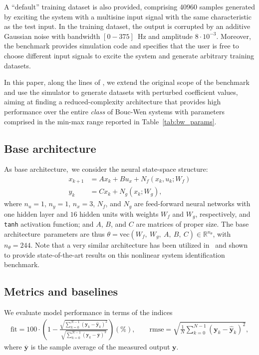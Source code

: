 \documentclass{article}
\newcommand{\base}{{base architecture}}
\newcommand{\seq}[1]{{\mathbf{#1}}}
\newcommand{\R}{\mathbb{R}}
\newcommand{\nsamp}{N}
\newcommand{\fullpar}{\theta}
\begin{document}
A ``default'' training dataset is also provided,  comprising 40960 samples generated by exciting the system with a multisine input signal with the same characteristic as the test input. In the training dataset, the output is corrupted by an additive Gaussian noise with bandwidth $[0 -375]$~Hz and amplitude $8 \cdot 10^{-3}$. Moreover, the benchmark provides simulation code and specifies that the user is free to choose different input signals to excite the system and generate arbitrary training datasets. 

In this paper, along the lines of \cite{chakrabarty2025meta}, we extend the original scope of the benchmark~\cite{noel2016hysteretic} and use the simulator to generate datasets with perturbed coefficient values, aiming at finding a reduced-complexity architecture that provides high performance over the entire \emph{class} of Bouc-Wen systems with parameters comprised in the min-max range reported in Table~\ref{tab:bw_params}. 


\subsection{Base architecture}
As \base,\ we consider the neural state-space structure:
\begin{subequations}
\label{eq:ss_boucwen}
\begin{align}
    x_{k+1} &= A x_k + B u_x + N_f(x_k, u_k; W_f) \\
    y_{k} &= C x_k +  N_g(x_k; W_g),
\end{align}
\end{subequations}
where $n_u=1$, $n_y=1$, $n_x=3$, $N_f$, and $N_g$ are feed-forward neural networks with one hidden layer and $16$ hidden units with weights $W_f$ and $W_g$, respectively, and \texttt{tanh} activation function; and $A$, $B$, and $C$ are matrices of proper size. The \base\ parameters are thus $\theta = \mathrm{vec}(W_f,\ W_g,\ A,\ B,\ C) \in \R^{n_\fullpar}$, with $n_\fullpar=244$. 
Note that a very similar architecture has been utilized in~\cite{schoukens2021improved} and shown to provide state-of-the-art results on this nonlinear system identification benchmark.

\subsection{Metrics and baselines}
We evaluate model performance in terms of the indices
\begin{equation*}
\begin{aligned}
\mathrm{fit} = 100\cdot \left(1- \frac{\sqrt{\sum_{k=0}^{\nsamp-1} \left(\seq{y}_k -  \hat {\seq{y}}_k\right)^2} }  
{\sqrt{\sum_{k=0}^{\nsamp-1} \left(\seq{y}_k -  {\overline{\seq{y}}}\right)^2}}\right) (\%), \qquad
\mathrm{rmse} = \sqrt{\frac{1}{\nsamp} \sum_{k=0}^{\nsamp-1} \left(\seq{y}_k -  \hat {\seq{y}}_k\right)^2},
\end{aligned}
\end{equation*}
where ${\overline{\seq{y}}}$ is the sample average of the measured output $\seq y$.
\end{document}
